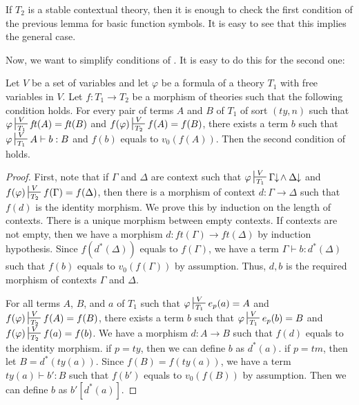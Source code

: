 \documentclass[reqno]{amsart}
\theoremstyle{definition}
\theoremstyle{remark}
\newcommand{\ft}{\mathit{ft}}
\newcommand{\ty}{\mathit{ty}}
\newcommand{\tm}{\mathit{tm}}
\numberwithin{figure}{section}
\begin{document}
\begin{remark}
If $T_2$ is a stable contextual theory, then it is enough to check the first condition of the previous lemma for basic function symbols.
It is easy to see that this implies the general case.
\end{remark}

Now, we want to simplify conditions of .
It is easy to do this for the second one:

\begin{lem}
Let $V$ be a set of variables and let $\varphi$ be a formula of a theory $T_1$ with free variables in $V$.
Let $f : T_1 \to T_2$ be a morphism of theories such that the following condition holds.
For every pair of terms $A$ and $B$ of $T_1$ of sort $(\ty,n)$ such that
$\varphi \sststile{T_1}{V} \ft(A) = \ft(B)$ and $f(\varphi) \sststile{T_2}{V} f(A) = f(B)$,
there exists a term $b$ such that $\varphi \sststile{T_1}{V} A \vdash b : B$ and $f(b)$ equals to $v_0(f(A))$.
Then the second condition of  holds.
\end{lem}
\begin{proof}
First, note that if $\Gamma$ and $\Delta$ are context such that $\varphi \sststile{T_1}{V} \Gamma\!\!\downarrow\!\land\:\Delta\!\!\downarrow$ and $f(\varphi) \sststile{T_2}{V} f(\Gamma) = f(\Delta)$,
then there is a morphism of context $d : \Gamma \to \Delta$ such that $f(d)$ is the identity morphism.
We prove this by induction on the length of contexts.
There is a unique morphism between empty contexts.
If contexts are not empty, then we have a morphism $d : \ft(\Gamma) \to \ft(\Delta)$ by induction hypothesis.
Since $f(d^*(\Delta))$ equals to $f(\Gamma)$, we have a term $\Gamma \vdash b : d^*(\Delta)$ such that $f(b)$ equals to $v_0(f(\Gamma))$ by assumption.
Thus, $d,b$ is the required morphism of contexts $\Gamma$ and $\Delta$.

For all terms $A$, $B$, and $a$ of $T_1$ such that $\varphi \sststile{T_1}{V} e_p(a) = A$ and $f(\varphi) \sststile{T_2}{V} f(A) = f(B)$,
there exists a term $b$ such that $\varphi \sststile{T_1}{V} e_p(b) = B$ and $f(\varphi) \sststile{T_2}{V} f(a) = f(b)$.
We have a morphism $d : A \to B$ such that $f(d)$ equals to the identity morphism.
if $p = \ty$, then we can define $b$ as $d^*(a)$.
if $p = \tm$, then let $B = d^*(\ty(a))$.
Since $f(B) = f(\ty(a))$, we have a term $\ty(a) \vdash b' : B$ such that $f(b')$ equals to $v_0(f(B))$ by assumption.
Then we can define $b$ as $b'[d^*(a)]$.
\end{proof}
\end{document}
